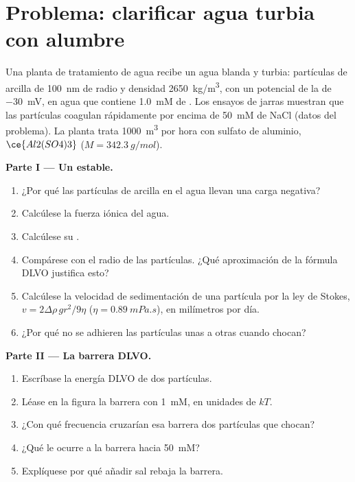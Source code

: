 \clearpage
\enlargethispage{3\baselineskip}
\section{Problema: clarificar agua turbia con alumbre}

\begin{problem}
\label{pb:b3:colloids:1}
Una planta de tratamiento de agua recibe un agua blanda y turbia: partículas de arcilla de
\qty{100}{nm} de radio y densidad \qty{2650}{kg/m^3}, con un potencial de la  de \qty{-30}{mV}, en
agua que contiene \qty{1.0}{mM} de . Los ensayos de jarras muestran que las partículas coagulan
rápidamente por encima de \qty{50}{mM} de NaCl (datos del problema). La planta trata \qty{1000}{m^3} por
hora con sulfato de aluminio, $\ce{Al2(SO4)3}$ ($M = \qty{342.3}{g/mol}$).

\medskip\noindent\textbf{Parte I --- Un  estable.}
\begin{enumerate}
  \item ¿Por qué las partículas de arcilla en el agua llevan una carga negativa?
  \item Calcúlese la fuerza iónica del agua.
  \item Calcúlese su .
  \item Compárese con el radio de las partículas. ¿Qué aproximación de la fórmula DLVO
        justifica esto?
  \item Calcúlese la velocidad de sedimentación de una partícula por la ley de Stokes, $v =
        2\Delta\rho\,gr^2/9\eta$ ($\eta = \qty{0.89}{mPa.s}$), en milímetros por día.
  \item ¿Por qué no se adhieren las partículas unas a otras cuando chocan?
\end{enumerate}

\medskip\noindent\textbf{Parte II --- La barrera DLVO.}
\begin{enumerate}[resume]
  \item Escríbase la energía DLVO de dos partículas.
  \item Léase en la figura la barrera con \qty{1}{mM}, en unidades de $kT$.
  \item ¿Con qué frecuencia cruzarían esa barrera dos partículas que chocan?
  \item ¿Qué le ocurre a la barrera hacia \qty{50}{mM}?
  \item Explíquese por qué añadir sal rebaja la barrera.
\end{enumerate}


\end{problem}
